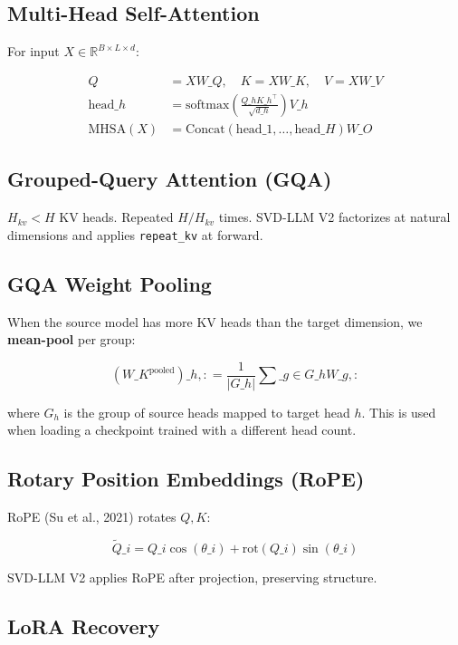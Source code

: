 \subsection{Multi-Head Self-Attention}

For input $X \in \mathbb{R}^{B \times L \times d}$:

\[
\begin{aligned}
Q &= X W\_Q, \quad K = X W\_K, \quad V = X W\_V \\
\text{head}\_h &= \text{softmax}\!\left(\frac{Q\_h K\_h^\top}{\sqrt{d\_h}}\right) V\_h \\
\text{MHSA}(X) &= \text{Concat}(\text{head}\_1, \dots, \text{head}\_H) W\_O
\end{aligned}
\tag{3.8}
\]

\subsection{Grouped-Query Attention (GQA)}

$H_{kv} < H$ KV heads. Repeated $H / H_{kv}$ times. SVD-LLM V2 factorizes at 
natural dimensions and applies \texttt{repeat\_kv} at forward.

\subsection{GQA Weight Pooling}

When the source model has more KV heads than the target dimension, we 
\textbf{mean-pool} per group:

\[
(W\_K^{\text{pooled}})\_{h, :} = \frac{1}{|G\_h|} \sum\_{g \in G\_h} W\_{g, :}
\tag{3.9}
\]

where $G_h$ is the group of source heads mapped to target head $h$. This is 
used when loading a checkpoint trained with a different head count.

\subsection{Rotary Position Embeddings (RoPE)}

RoPE (Su et al., 2021) rotates $Q, K$:

\[
\tilde{Q}\_i = Q\_i \cos(\theta\_i) + \text{rot}(Q\_i) \sin(\theta\_i)
\tag{3.10}
\]

SVD-LLM V2 applies RoPE after projection, preserving structure.

\subsection{LoRA Recovery}

